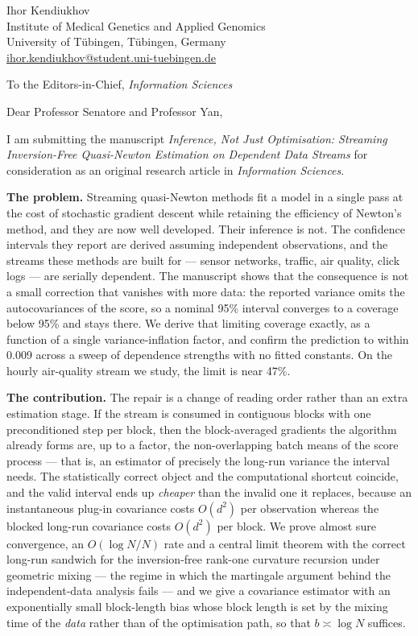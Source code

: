 \documentclass[11pt]{article}
\begin{document}
\noindent
Ihor Kendiukhov\\
Institute of Medical Genetics and Applied Genomics\\
University of T\"ubingen, T\"ubingen, Germany\\
\href{mailto:ihor.kendiukhov@student.uni-tuebingen.de}{ihor.kendiukhov@student.uni-tuebingen.de}

\bigskip
\noindent
To the Editors-in-Chief, \emph{Information Sciences}

\bigskip
\noindent
Dear Professor Senatore and Professor Yan,

I am submitting the manuscript \emph{Inference, Not Just Optimisation: Streaming Inversion-Free
Quasi-Newton Estimation on Dependent Data Streams} for consideration as an original research
article in \emph{Information Sciences}.

\textbf{The problem.} Streaming quasi-Newton methods fit a model in a single pass at the cost of
stochastic gradient descent while retaining the efficiency of Newton's method, and they are now
well developed. Their inference is not. The confidence intervals they report are derived assuming
independent observations, and the streams these methods are built for --- sensor networks, traffic,
air quality, click logs --- are serially dependent. The manuscript shows that the consequence is
not a small correction that vanishes with more data: the reported variance omits the
autocovariances of the score, so a nominal 95\% interval converges to a coverage below 95\% and
stays there. We derive that limiting coverage exactly, as a function of a single
variance-inflation factor, and confirm the prediction to within 0.009 across a sweep of dependence
strengths with no fitted constants. On the hourly air-quality stream we study, the limit is near
47\%.

\textbf{The contribution.} The repair is a change of reading order rather than an extra estimation
stage. If the stream is consumed in contiguous blocks with one preconditioned step per block, then
the block-averaged gradients the algorithm already forms are, up to a factor, the non-overlapping
batch means of the score process --- that is, an estimator of precisely the long-run variance the
interval needs. The statistically correct object and the computational shortcut coincide, and the
valid interval ends up \emph{cheaper} than the invalid one it replaces, because an instantaneous
plug-in covariance costs $O(d^2)$ per observation whereas the blocked long-run covariance costs
$O(d^2)$ per block. We prove almost sure convergence, an $O(\log N / N)$ rate and a central limit
theorem with the correct long-run sandwich for the inversion-free rank-one curvature recursion
under geometric mixing --- the regime in which the martingale argument behind the independent-data
analysis fails --- and we give a covariance estimator with an exponentially small block-length
bias whose block length is set by the mixing time of the \emph{data} rather than of the
optimisation path, so that $b \asymp \log N$ suffices.
\end{document}
